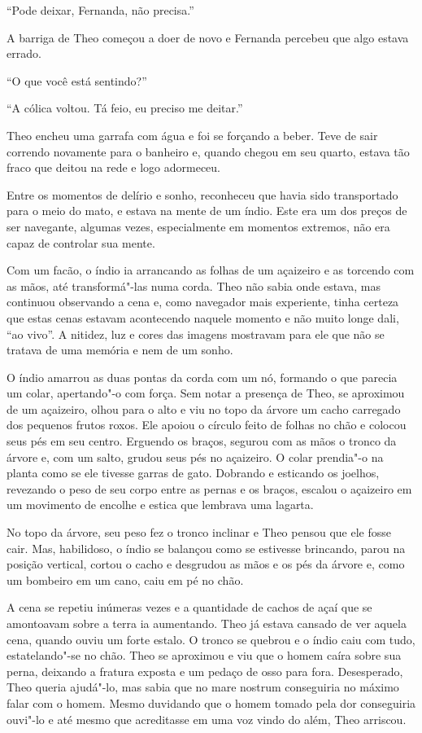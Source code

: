 ``Pode deixar, Fernanda, não precisa.''

A barriga de Theo começou a doer de novo e Fernanda percebeu que algo
estava errado.

``O que você está sentindo?''

``A cólica voltou. Tá feio, eu preciso me deitar.''

Theo encheu uma garrafa com água e foi se forçando a beber. Teve de sair
correndo novamente para o banheiro e, quando chegou em seu quarto, estava
tão fraco que deitou na rede e logo adormeceu.

Entre os momentos de delírio e sonho, reconheceu que havia sido
transportado para o meio do mato, e estava na mente de um índio. Este
era um dos preços de ser navegante, algumas vezes, especialmente em
momentos extremos, não era capaz de controlar sua mente.

Com um facão, o índio ia arrancando as folhas de um açaizeiro e as
torcendo com as mãos, até transformá"-las numa corda. Theo não sabia onde
estava, mas continuou observando a cena e, como navegador mais
experiente, tinha certeza que estas cenas estavam acontecendo naquele
momento e não muito longe dali, ``ao vivo''. A nitidez, luz e cores das
imagens mostravam para ele que não se tratava de uma memória e nem de um
sonho.

O índio amarrou as duas pontas da corda com um nó, formando o que
parecia um colar, apertando"-o com força. Sem notar a presença de Theo,
se aproximou de um açaizeiro, olhou para o alto e viu no topo da árvore
um cacho carregado dos pequenos frutos roxos. Ele apoiou o círculo feito
de folhas no chão e colocou seus pés em seu centro. Erguendo os braços,
segurou com as mãos o tronco da árvore e, com um salto, grudou seus pés
no açaizeiro. O colar prendia"-o na planta como se ele tivesse garras de
gato. Dobrando e esticando os joelhos, revezando o peso de seu corpo
entre as pernas e os braços, escalou o açaizeiro em um movimento de
encolhe e estica que lembrava uma lagarta.

No topo da árvore, seu peso fez o tronco inclinar e Theo pensou que ele
fosse cair. Mas, habilidoso, o índio se balançou como se estivesse
brincando, parou na posição vertical, cortou o cacho e desgrudou as mãos
e os pés da árvore e, como um bombeiro em um cano, caiu em pé no chão.

A cena se repetiu inúmeras vezes e a quantidade de cachos de açaí que se
amontoavam sobre a terra ia aumentando. Theo já estava cansado de ver
aquela cena, quando ouviu um forte estalo. O tronco se quebrou e o índio
caiu com tudo, estatelando"-se no chão. Theo se aproximou e viu que o
homem caíra sobre sua perna, deixando a fratura exposta e um pedaço de
osso para fora. Desesperado, Theo queria ajudá"-lo, mas sabia que no
mare nostrum conseguiria no máximo falar com o homem. Mesmo duvidando que
o homem tomado pela dor conseguiria ouvi"-lo e até mesmo que acreditasse
em uma voz vindo do além, Theo arriscou.

